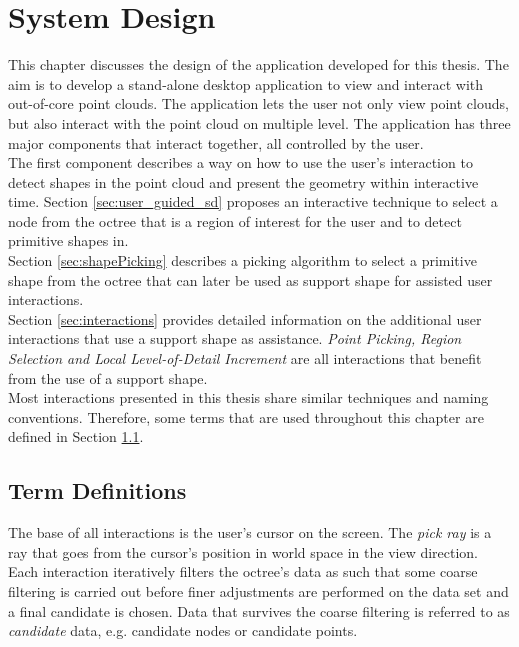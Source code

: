 \chapter{System Design}


This chapter discusses the design of the application developed for this thesis. The aim is to develop a stand-alone desktop application to view and interact with out-of-core point clouds. The application lets the user not only view point clouds, but also interact with the point cloud on multiple level. The application has three major components that interact together, all controlled by the user. 
\\
The first component describes a way on how to use the user's interaction to detect shapes in the point cloud and present the geometry within interactive time. Section \ref{sec:user_guided_sd} proposes an interactive technique to select a node from the octree that is a region of interest for the user and to detect primitive shapes in. 
\\
Section \ref{sec:shapePicking} describes a picking algorithm to select a primitive shape from the octree that can later be used as support shape for assisted user interactions. 
\\
Section \ref{sec:interactions} provides detailed information on the additional user interactions that use a support shape as assistance. \textit{Point Picking, Region Selection and Local Level-of-Detail Increment} are all interactions that benefit from the use of a support shape. 
\\
Most interactions presented in this thesis share similar techniques and naming conventions. Therefore, some terms that are used throughout this chapter are defined in Section \ref{sec:termDefinitions}. 


\section{Term Definitions}
\label{sec:termDefinitions}

The base of all interactions is the user's cursor on the screen. The \textit{pick ray} is a ray that goes from the cursor’s position in world space in the view direction. 
Each interaction iteratively filters the octree's data as such that some coarse filtering is carried out before finer adjustments are performed on the data set and a final candidate is chosen. Data that survives the coarse filtering is referred to as \textit{candidate} data, e.g. candidate nodes or candidate points. 


